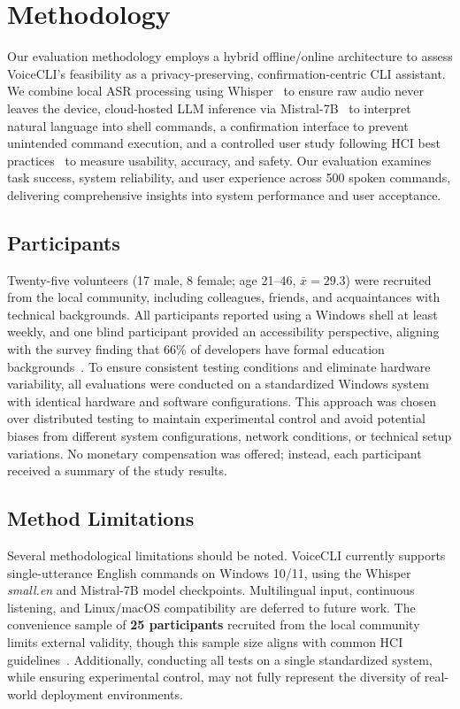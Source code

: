 \documentclass[a4paper,12pt]{article}
\begin{document}
\newpage
\section{Methodology}
\label{sec:method}

Our evaluation methodology employs a hybrid offline/online architecture to assess VoiceCLI's feasibility as a privacy-preserving, confirmation-centric CLI assistant. We combine local ASR processing using Whisper~\cite{ref10} to ensure raw audio never leaves the device, cloud-hosted LLM inference via Mistral-7B~\cite{ref11} to interpret natural language into shell commands, a confirmation interface to prevent unintended command execution, and a controlled user study following HCI best practices~\cite{ref12,ref4} to measure usability, accuracy, and safety. Our evaluation examines task success, system reliability, and user experience across 500 spoken commands, delivering comprehensive insights into system performance and user acceptance.

\subsection{Participants}
\noindent Twenty-five volunteers (17 male, 8 female; age 21–46, $\bar{x}=29.3$) were recruited from the local community, including colleagues, friends, and acquaintances with technical backgrounds. All participants reported using a Windows shell at least weekly, and one blind participant provided an accessibility perspective, aligning with the survey finding that 66\% of developers have formal education backgrounds~\cite{ref2}. To ensure consistent testing conditions and eliminate hardware variability, all evaluations were conducted on a standardized Windows system with identical hardware and software configurations. This approach was chosen over distributed testing to maintain experimental control and avoid potential biases from different system configurations, network conditions, or technical setup variations. No monetary compensation was offered; instead, each participant received a summary of the study results.

\subsection{Method Limitations}
\noindent Several methodological limitations should be noted. VoiceCLI currently supports single-utterance English commands on Windows 10/11, using the Whisper \textit{small.en} and Mistral-7B model checkpoints. Multilingual input, continuous listening, and Linux/macOS compatibility are deferred to future work. The convenience sample of \textbf{25 participants} recruited from the local community limits external validity, though this sample size aligns with common HCI guidelines~\cite{ref12}. Additionally, conducting all tests on a single standardized system, while ensuring experimental control, may not fully represent the diversity of real-world deployment environments.
\end{document}
